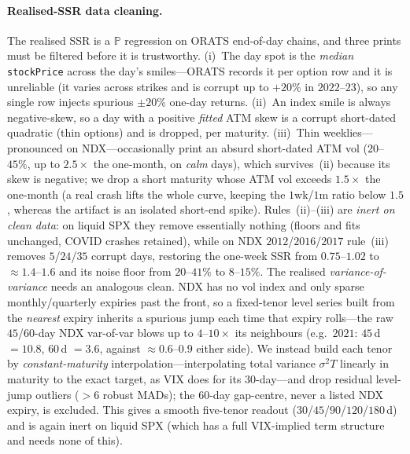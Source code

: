 \documentclass[11pt]{article}
\begin{document}
\paragraph{Realised-SSR data cleaning.} The realised SSR is a $\mathbb P$ regression on ORATS end-of-day
chains, and three prints must be filtered before it is trustworthy. (i)~The day spot is the \emph{median}
\texttt{stockPrice} across the day's smiles---ORATS records it per option row and it is unreliable (it varies
across strikes and is corrupt up to $+20\%$ in $2022$--$23$), so any single row injects spurious ${\pm}20\%$
one-day returns. (ii)~An index smile is always negative-skew, so a day with a positive \emph{fitted} ATM skew
is a corrupt short-dated quadratic (thin options) and is dropped, per maturity. (iii)~Thin weeklies---pronounced
on NDX---occasionally print an absurd short-dated ATM vol ($20$--$45\%$, up to $2.5\times$ the one-month, on
\emph{calm} days), which survives~(ii) because its skew is negative; we drop a short maturity whose ATM vol
exceeds $1.5\times$ the one-month (a real crash lifts the whole curve, keeping the $1$wk/$1$m ratio below $1.5$,
whereas the artifact is an isolated short-end spike). Rules~(ii)--(iii) are \emph{inert on clean data}: on
liquid SPX they remove essentially nothing (floors and fits unchanged, COVID crashes retained), while on NDX
$2012$/$2016$/$2017$ rule~(iii) removes $5$/$24$/$35$ corrupt days, restoring the one-week SSR from $0.75$--$1.02$
to ${\approx}1.4$--$1.6$ and its noise floor from $20$--$41\%$ to $8$--$15\%$.
The realised \emph{variance-of-variance} needs an analogous clean. NDX has no vol index and only sparse
monthly/quarterly expiries past the front, so a fixed-tenor level series built from the \emph{nearest} expiry
inherits a spurious jump each time that expiry rolls---the raw $45$/$60$-day NDX var-of-var blows up to
$4$--$10\times$ its neighbours (e.g.\ $2021$: $45$\,d $=10.8$, $60$\,d $=3.6$, against ${\approx}0.6$--$0.9$
either side). We instead build each tenor by \emph{constant-maturity} interpolation---interpolating total
variance $\sigma^2 T$ linearly in maturity to the exact target, as VIX does for its $30$-day---and drop
residual level-jump outliers ($>6$ robust MADs); the $60$-day gap-centre, never a listed NDX expiry, is
excluded. This gives a smooth five-tenor readout ($30$/$45$/$90$/$120$/$180$\,d) and is again inert on liquid
SPX (which has a full VIX-implied term structure and needs none of this).
\end{document}
